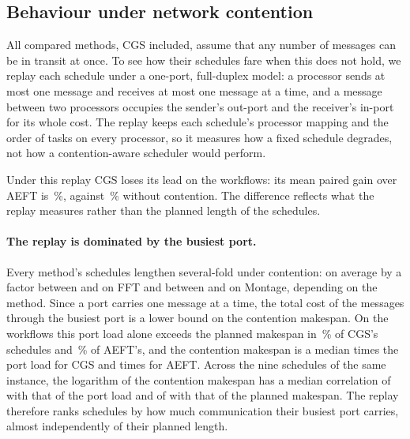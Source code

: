 

\subsection{Behaviour under network contention}
\label{sec:contention}

All compared methods, CGS included, assume that any number of messages can be in transit at once. To see how
their schedules fare when this does not hold, we replay each schedule under a one-port, full-duplex model:
a processor sends at most one message and receives at most one message at a time, and a message between two
processors occupies the sender's out-port and the receiver's in-port for its whole cost. The replay keeps each
schedule's processor mapping and the order of tasks on every processor, so it measures how a fixed schedule
degrades, not how a contention-aware scheduler would perform.

Under this replay CGS loses its lead on the workflows: its mean paired gain over AEFT is
\WCWfAeftGainCont\,\%, against \WCWfAeftGainPlan\,\% without contention. The difference reflects what the replay measures rather than the
planned length of the schedules.

\paragraph{The replay is dominated by the busiest port.}
Every method's schedules lengthen several-fold under contention: on average by a factor between
\WCFftInflMin{} and \WCFftInflMax{} on FFT and between \WCMontageInflMin{} and \WCMontageInflMax{} on Montage,
depending on the method. Since a port carries one message at a time, the total cost of the messages through the
busiest port is a lower bound on the contention makespan. On the workflows this port load alone exceeds the
planned makespan in \WCWfCgsPortExceeds\,\% of CGS's schedules and \WCWfAeftPortExceeds\,\% of AEFT's, and the
contention makespan is a median \WCWfCgsContOverPort{} times the port load for CGS and \WCWfAeftContOverPort{}
times for AEFT. Across the nine schedules of the same instance, the logarithm of
the contention makespan has a median correlation of \WCWfCorrPort{} with that of the port load and of
\WCWfCorrPlan{} with that of the planned makespan. The replay therefore ranks schedules by how much
communication their busiest port carries, almost independently of their planned length.

